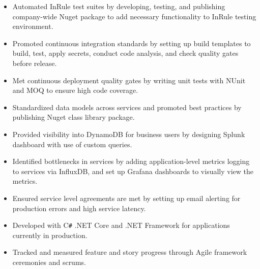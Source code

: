 \documentclass[overlapped]{res}
\begin{document}
\begin{resume}
\begin{itemize}
                  \item Automated InRule test suites by developing, testing, and publishing
                  company-wide Nuget package to add
                  necessary functionality to InRule testing environment.

                  \item Promoted continuous integration standards by setting up build templates to build,
                  test, apply secrets, conduct code analysis,
                  and check quality gates before release.

                  \item Met continuous deployment quality gates by writing unit tests
                  with NUnit and MOQ to ensure high code coverage.

                  \item Standardized data models across services
                  and promoted best practices
                  by publishing Nuget class library package.


                  \item Provided visibility into DynamoDB for business users
                  by designing Splunk dashboard with use of
                  custom queries.

                  \item Identified bottlenecks in services by adding application-level
                  metrics logging to services via InfluxDB,
                  and set up Grafana dashboards to visually view the metrics.

                  \item Ensured service level agreements are met by setting up email alerting 
                  for production errors and high service latency.

                  \item Developed with C\texttt{\#} .NET Core and .NET Framework
                  for applications currently in production.

                  \item Tracked and measured feature and story progress through
                  Agile framework ceremonies and scrums.

                \end{itemize}


\end{resume}
\end{document}
